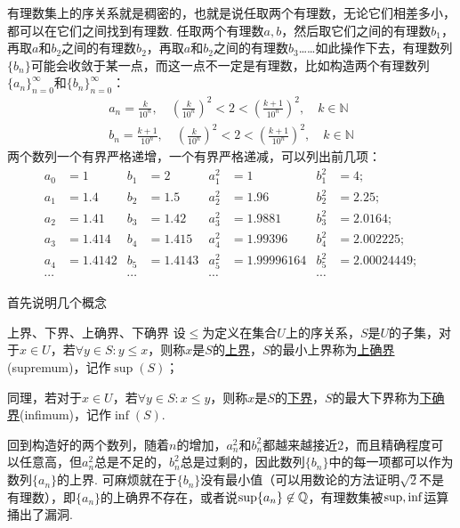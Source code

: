 \documentclass[main.tex]{subfiles}
\begin{document}
有理数集上的序关系就是稠密的，也就是说任取两个有理数，无论它们相差多小，都可以在它们之间找到有理数. 任取两个有理数\(a,b\)，然后取它们之间的有理数\(b_1\)，再取\(a\)和\(b_2\)之间的有理数\(b_2\)，再取\(a\)和\(b_2\)之间的有理数\(b_3\)……如此操作下去，有理数列\(\{b_n\}\)可能会收敛于某一点，而这一点不一定是有理数，比如构造两个有理数列\(\{a_n\}_{n=0}^{\infty}\)和\(\{b_n\}_{n=0}^{\infty}\)：
\begin{eqnarray*}
    a_n=\frac{k}{10^n}, \quad\left(\frac{k}{10^n}\right)^2<2<\left(\frac{k+1}{10^n}\right)^2, \quad k\in\mathbb{N} \\
    b_n=\frac{k+1}{10^n}, \quad\left(\frac{k}{10^n}\right)^2<2<\left(\frac{k+1}{10^n}\right)^2, \quad k\in\mathbb{N}
\end{eqnarray*}
两个数列一个有界严格递增，一个有界严格递减，可以列出前几项：
\newline
\begin{align*}
a_0 &= 1 & b_1 &= 2 & a_1^2 &= 1 & b_1^2 &= 4; \\
a_1 &= 1.4 & b_2 &= 1.5 & a_2^2 &= 1.96 & b_2^2 &= 2.25; \\
a_2 &= 1.41 & b_3 &= 1.42 & a_3^2 &= 1.9881 & b_3^2 &= 2.0164; \\
a_3 &= 1.414 & b_4 &= 1.415 & a_4^2 &= 1.99396 & b_4^2 &= 2.002225; \\
a_4 &= 1.4142 & b_5 &= 1.4143 & a_5^2 &= 1.99996164 & b_5^2 &= 2.00024449; \\
\cdots & & \cdots && \cdots && \cdots
\end{align*}

首先说明几个概念
\begin{definition}{上界、下界、上确界、下确界}
    设\(\leq\)为定义在集合\(U\)上的序关系，\(S\)是\(U\)的子集，对于\(x \in U\)，若\(\forall y\in S: y\leq x\)，则称\(x\)是\(S\)的\uline{上界}，\(S\)的最小上界称为\uline{上确界}(supremum)，记作\(\sup(S)\)；
    \par
    同理，若对于\(x \in U\)，若\(\forall y\in S: x\leq y\)，则称\(x\)是\(S\)的\uline{下界}，\(S\)的最大下界称为\uline{下确界}(infimum)，记作\(\inf(S)\).
\end{definition}

回到构造好的两个数列，随着\(n\)的增加，\(a_n^2\)和\(b_n^2\)都越来越接近\(2\)，而且精确程度可以任意高，但\(a_n^2\)总是不足的，\(b_n^2\)总是过剩的，因此数列\(\{b_n\}\)中的每一项都可以作为数列\(\{a_n\}\)的上界. 可麻烦就在于\(\{b_n\}\)没有最小值（可以用数论的方法证明\(\sqrt{2}\)不是有理数），即\(\{a_n\}\)的上确界不存在，或者说\({\rm sup}\{a_n\}\not \in \mathbb{Q}\)，有理数集被\({\rm sup},{\rm inf}\)运算捅出了漏洞.
\end{document}
